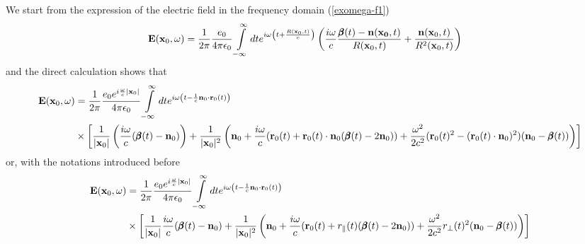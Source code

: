 We start from the expression of the electric field in the frequency domain (\ref{exomega-f1})
\begin{align}
    {\bf E}({\bf x}_0,\omega) & =\frac1{2\pi}\frac{e_0}{4\pi\epsilon_0}\int\limits_{-\infty}^{\infty}dte^{i\omega\left( t+\frac{R({\bf x}_0,t)}{c}\right)}\left(\frac{i\omega}c\frac{{\pmb \beta}(t)-{\bf n}({\bf x_0},t)}{R({\bf x}_0,t)}+\frac{{\bf n}({\bf x}_0,t)}{R^2({\bf x}_0,t)}\right)
\end{align}
and the direct calculation shows that
\begin{align}
    {\bf E}({\bf x}_0,\omega) & =\frac1{2\pi}\frac{e_0 e^{i\frac{\omega}{c}|{\bf x}_0|}}{4\pi\epsilon_0}\int\limits_{-\infty}^{\infty}dte^{i\omega\left( t-\frac1c{\bf n}_0\cdot{\bf r}_0(t)\right)}\nonumber                                                                                                                                                   \\
                              & \times\left[\frac1{|{\bf x}_0|}\left(\frac{i\omega}c({\pmb \beta}(t)-{\bf n}_0)\right)+\frac1{|{\bf x}_0|^2}\left({\bf n}_0+\frac{i\omega}c({\bf r}_0(t)+{\bf r}_0(t)\cdot{\bf n}_0({\pmb \beta}(t)-2{\bf n}_0))+\frac{\omega^2}{2c^2}({\bf r}_0(t)^2 -({\bf r}_0(t)\cdot{\bf n}_0)^2)({\bf n}_0-{\pmb \beta}(t))\right)\right]
\end{align}
or, with the notations introduced before
\begin{align}
    {\bf E}({\bf x}_0,\omega) & =\frac1{2\pi}\frac{e_0 e^{i\frac{\omega}{c}|{\bf x}_0|}}{4\pi\epsilon_0}\int\limits_{-\infty}^{\infty}dte^{i\omega\left( t-\frac1c{\bf n}_0\cdot{\bf r}_0(t)\right)}\nonumber                                                                                      \\
                              & \times\left[\frac1{|{\bf x}_0|}\frac{i\omega}c({\pmb \beta}(t)-{\bf n}_0)+\frac1{|{\bf x}_0|^2}\left({\bf n}_0+\frac{i\omega}c({\bf r}_0(t)+r_\parallel(t)({\pmb \beta}(t)-2{\bf n}_0))+\frac{\omega^2}{2c^2}r_\perp(t)^2({\bf n}_0-{\pmb \beta}(t))\right)\right]
\end{align}

